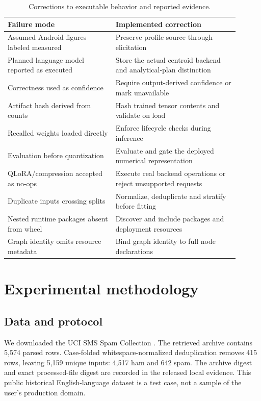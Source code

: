 \documentclass[11pt,a4paper]{article}
\begin{document}
\begin{table}[ht]
\centering\small
\begin{tabular}{p{0.42\linewidth}p{0.48\linewidth}}
\toprule
Failure mode & Implemented correction \\
\midrule
Assumed Android figures labeled measured & Preserve profile source through elicitation \\
Planned language model reported as executed & Store the actual centroid backend and analytical-plan distinction \\
Correctness used as confidence & Require output-derived confidence or mark unavailable \\
Artifact hash derived from counts & Hash trained tensor contents and validate on load \\
Recalled weights loaded directly & Enforce lifecycle checks during inference \\
Evaluation before quantization & Evaluate and gate the deployed numerical representation \\
QLoRA/compression accepted as no-ops & Execute real backend operations or reject unsupported requests \\
Duplicate inputs crossing splits & Normalize, deduplicate and stratify before fitting \\
Nested runtime packages absent from wheel & Discover and include packages and deployment resources \\
Graph identity omits resource metadata & Bind graph identity to full node declarations \\
\bottomrule
\end{tabular}
\caption{Corrections to executable behavior and reported evidence.}
\label{tab:audit}
\end{table}

\section{Experimental methodology}
\subsection{Data and protocol}
We downloaded the UCI SMS Spam Collection \cite{sms}. The retrieved archive
contains 5,574 parsed rows. Case-folded whitespace-normalized deduplication removes
415 rows, leaving 5,159 unique inputs: 4,517 ham and 642 spam. The archive digest
and exact processed-file digest are recorded in the released local evidence.
This public historical English-language dataset is a test case, not a sample of
the user's production domain.
\end{document}
